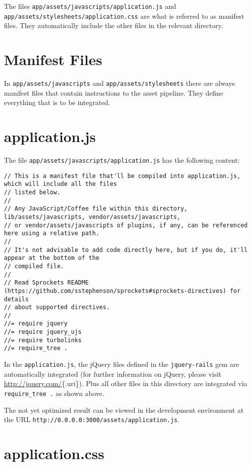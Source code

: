 \documentclass[a4paper]{book}
\begin{document}
The files \texttt{app/assets/javascripts/application.js} and \texttt{app/assets/stylesheets/application.css} are what is referred to as manifest files. They automatically include the other files in the relevant directory.

\section{Manifest Files}\label{manifest-files}

In \texttt{app/assets/javascripts} and \texttt{app/assets/stylesheets} there are always manifest files that contain instructions to the asset pipeline. They define everything that is to be integrated.

\section{application.js}\label{application.js}

The file \texttt{app/assets/javascripts/application.js} has the following content:

\begin{shaded}\begin{verbatim}
// This is a manifest file that'll be compiled into application.js, which will include all the files
// listed below.
//
// Any JavaScript/Coffee file within this directory, lib/assets/javascripts, vendor/assets/javascripts,
// or vendor/assets/javascripts of plugins, if any, can be referenced here using a relative path.
//
// It's not advisable to add code directly here, but if you do, it'll appear at the bottom of the
// compiled file.
//
// Read Sprockets README (https://github.com/sstephenson/sprockets#sprockets-directives) for details
// about supported directives.
//
//= require jquery
//= require jquery_ujs
//= require turbolinks
//= require_tree .
\end{verbatim}\end{shaded}

In the \texttt{application.js}, the jQuery files defined in the \texttt{jquery-rails} gem are automatically integrated (for further information on jQuery, please visit \url{http://jquery.com/}\{.uri\}). Plus all other files in this directory are integrated via \texttt{require\_tree         .} as shown above.

The not yet optimized result can be viewed in the development environment at the URL \texttt{http://0.0.0.0:3000/assets/application.js}.

\section{application.css}\label{application.css}
\end{document}
